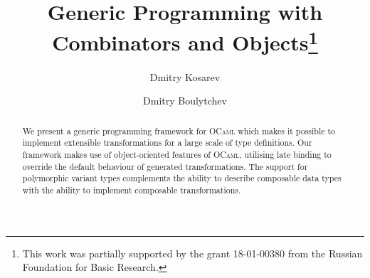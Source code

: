 \documentclass[runningheads]{llncs}
\begin{document}
	\title{Generic Programming with Combinators and Objects\thanks{This work was partially supported by the grant 18-01-00380 from the Russian Foundation for Basic Research.}}
	\author{Dmitry Kosarev \and
		Dmitry Boulytchev 
	}
	\maketitle              %
	\begin{abstract}
  We present a generic programming framework for \textsc{OCaml} which makes it possible to implement extensible
  transformations for a large scale of type definitions. Our framework makes use of object-oriented features
  of \textsc{OCaml}, utilising late binding to override the default behaviour of generated transformations. The
  support for polymorphic variant types complements the ability to describe composable data types with the
  ability to implement composable transformations.
		
	\end{abstract}
\end{document}
